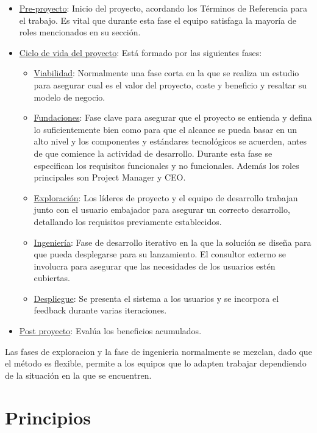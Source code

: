 \documentclass[12pt,a4paper]{article}
\begin{document}
\begin{itemize}
	\item \underline{Pre-proyecto}: Inicio del proyecto, acordando los Términos de Referencia para el trabajo. Es vital que durante esta fase el equipo satisfaga la mayoría de roles mencionados en su sección.
	\item \underline{Ciclo de vida del proyecto}: Está formado por las siguientes fases:
	\begin{itemize}
		\item \underline{Viabilidad}: Normalmente una fase corta en la que se realiza un estudio para asegurar cual es el valor del proyecto, coste y beneficio y resaltar su modelo de negocio.
		\item \underline{Fundaciones}: Fase clave para asegurar que el proyecto se entienda y defina lo suficientemente bien como para que el alcance se pueda basar en un alto nivel y los componentes y estándares tecnológicos se acuerden, antes de que comience la actividad de desarrollo. Durante esta fase se especifican los requisitos funcionales y no funcionales. Además los roles principales son Project Manager y CEO.
		\item \underline{Exploración}: Los líderes de proyecto y el equipo de desarrollo trabajan junto con el usuario embajador para asegurar un correcto desarrollo, detallando los requisitos previamente establecidos.
		\item \underline{Ingeniería}: Fase de desarrollo iterativo en la que la solución se diseña para que pueda desplegarse para su lanzamiento. El consultor externo se involucra para asegurar que las necesidades de los usuarios estén cubiertas.
		\item \underline{Despliegue}: Se presenta el sistema a los usuarios y se incorpora el feedback durante varias iteraciones.
	\end{itemize}
 	\item \underline{Post proyecto}: Evalúa los beneficios acumulados.
\end{itemize}
	
Las fases de exploracion y la fase de ingenieria normalmente se mezclan, dado que el método es flexible, permite a los equipos que lo adapten trabajar dependiendo de la situación en la que se encuentren.


\section{Principios}
\end{document}
